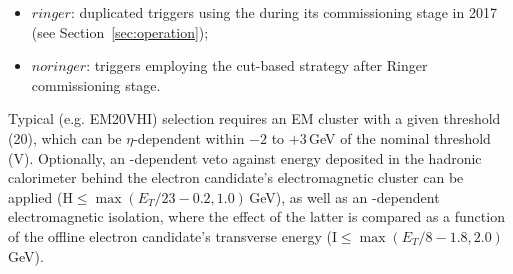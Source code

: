 \begin{itemize}
\item $ringer$: duplicated triggers using the \rnn during its
  commissioning stage in 2017 (see Section~\ref{sec:operation});
\item $noringer$: triggers employing the cut-based strategy after Ringer
  commissioning stage.
\end{itemize}


Typical \licalo (e.g. EM20VHI) selection requires an EM cluster with a
given threshold (20), which can be  $\eta$-dependent within $-2$ to $+3\,$GeV
of the nominal threshold (V). Optionally, an \et-dependent veto against energy
deposited in the hadronic calorimeter behind the electron candidate's
electromagnetic cluster can be applied (H$\le \max(E_T/23-0.2, 1.0)\,$GeV), as
well as an \et-dependent electromagnetic isolation, where the effect of the
latter is compared as a function of the offline electron candidate's transverse
energy (I$\le \max(E_T/8-1.8, 2.0)\,$GeV).


